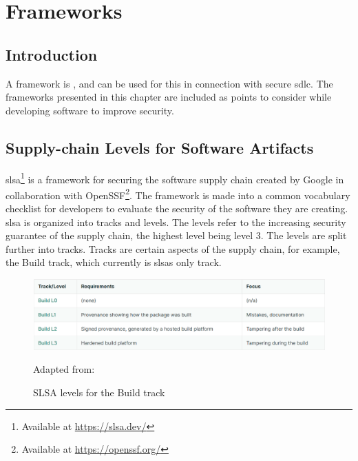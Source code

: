 \section{Frameworks}
\subsection{Introduction}
A framework is  \cite{FrameworkDefinition}, and can be used for this in connection with secure \acrshort{sdlc}. The frameworks presented in this chapter are included as points to consider while developing software to improve security.

\subsection{Supply-chain Levels for Software Artifacts}
\acrlong{slsa}\footnote{Available at \url{https://slsa.dev/}} is a framework for securing the software supply chain created by Google in collaboration with OpenSSF\footnote{Available at \url{https://openssf.org/}}. The framework is made into a common vocabulary checklist for developers to evaluate the security of the software they are creating. \acrshort{slsa} is organized into tracks and levels. The levels refer to the increasing security guarantee of the supply chain, the highest level being level 3. The levels are split further into tracks. Tracks are certain aspects of the supply chain, for example, the Build track, which currently is \acrshort{slsa}s only track. \cite{SLSAgeneral}

\vspace{2mm}
\begin{figure}[H]
    \centering
    \includegraphics[width=0.8\columnwidth]{Images/slsalevels.png}
    \caption{SLSA levels for the Build track} Adapted from: \cite{SLSAlevels}
    \label{fig: SLSA levels for the Build track}
\end{figure}


